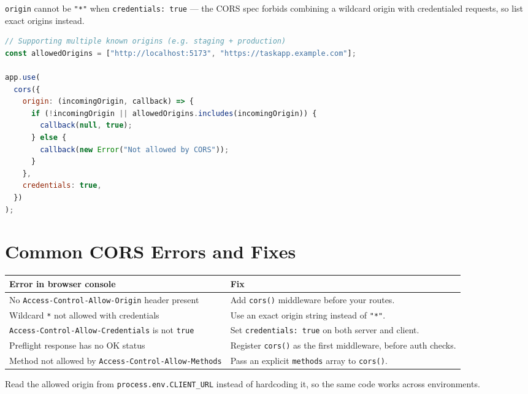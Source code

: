 \begin{warnbox}[WARNING]
\texttt{origin} cannot be \texttt{"*"} when \texttt{credentials: true} ---
the CORS spec forbids combining a wildcard origin with credentialed
requests, so list exact origins instead.
\end{warnbox}

\begin{lstlisting}[language=JavaScript]
// Supporting multiple known origins (e.g. staging + production)
const allowedOrigins = ["http://localhost:5173", "https://taskapp.example.com"];

app.use(
  cors({
    origin: (incomingOrigin, callback) => {
      if (!incomingOrigin || allowedOrigins.includes(incomingOrigin)) {
        callback(null, true);
      } else {
        callback(new Error("Not allowed by CORS"));
      }
    },
    credentials: true,
  })
);
\end{lstlisting}

\section{Common CORS Errors and Fixes}

\begin{table}[h]
\centering
\begin{tabularx}{\textwidth}{X X}
\toprule
\textbf{Error in browser console} & \textbf{Fix} \\
\midrule
No \texttt{Access-Control-Allow-Origin} header present &
Add \texttt{cors()} middleware before your routes. \\
\addlinespace
Wildcard \texttt{*} not allowed with credentials &
Use an exact origin string instead of \texttt{"*"}. \\
\addlinespace
\texttt{Access-Control-Allow-Credentials} is not \texttt{true} &
Set \texttt{credentials: true} on both server and client. \\
\addlinespace
Preflight response has no OK status &
Register \texttt{cors()} as the first middleware, before auth checks. \\
\addlinespace
Method not allowed by \texttt{Access-Control-Allow-Methods} &
Pass an explicit \texttt{methods} array to \texttt{cors()}. \\
\bottomrule
\end{tabularx}
\end{table}

\begin{tipbox}[TIP]
Read the allowed origin from \texttt{process.env.CLIENT\_URL} instead of
hardcoding it, so the same code works across environments.
\end{tipbox}
